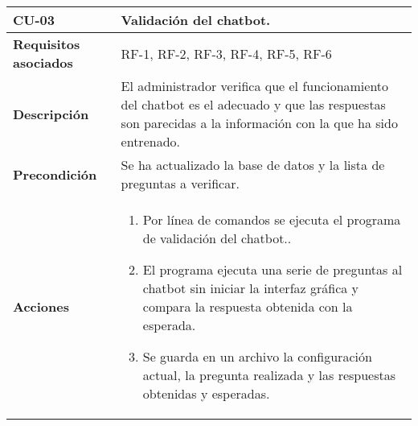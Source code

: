 \newpage
\begin{longtable}[H]{@{}ll@{}}
	\toprule
	\begin{minipage}[b]{0.23\columnwidth}\raggedright\strut
		\textbf{CU-03}\strut
	\end{minipage} & \begin{minipage}[b]{0.71\columnwidth}\raggedright\strut
		\textbf{Validación del chatbot.}\strut
	\end{minipage}\tabularnewline
	\midrule
	\endhead  
	\begin{minipage}[t]{0.23\columnwidth}\raggedright\strut
		\textbf{Requisitos asociados}\strut
	\end{minipage} & \begin{minipage}[t]{0.71\columnwidth}\raggedright\strut
		RF-1, RF-2, RF-3, RF-4, RF-5, RF-6\strut
	\end{minipage}\tabularnewline
	\begin{minipage}[t]{0.23\columnwidth}\raggedright\strut
		\textbf{Descripción}\strut
	\end{minipage} & \begin{minipage}[t]{0.71\columnwidth}\raggedright\strut
		El administrador verifica que el funcionamiento del chatbot es el adecuado y que las respuestas son parecidas a la información con la que ha sido entrenado.\strut
	\end{minipage}\tabularnewline
	\begin{minipage}[t]{0.23\columnwidth}\raggedright\strut
		\textbf{Precondición}\strut
	\end{minipage} & \begin{minipage}[t]{0.71\columnwidth}\raggedright\strut
		Se ha actualizado la base de datos y la lista de preguntas a verificar.\strut
	\end{minipage}\tabularnewline
	\begin{minipage}[t]{0.23\columnwidth}\raggedright\strut
		\textbf{Acciones}\strut
	\end{minipage} & \begin{minipage}[t]{0.71\columnwidth}\raggedright\strut
		\begin{enumerate}
			\def\labelenumi{\arabic{enumi}.}
			\tightlist
			\item Por línea de comandos se ejecuta el programa de validación del chatbot..
                \item El programa ejecuta una serie de preguntas al chatbot sin iniciar la interfaz gráfica y compara la respuesta obtenida con la esperada.
			\item Se guarda en un archivo la configuración actual, la pregunta realizada y las respuestas obtenidas y esperadas.

\end{enumerate}
\end{minipage}
\end{longtable}
